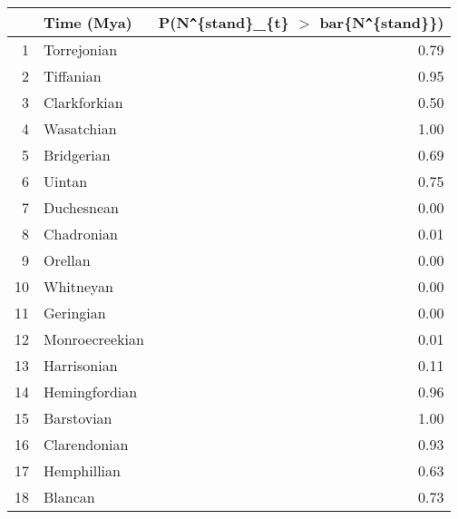 \begin{table}[ht]
\centering
\begin{tabular}{rlr}
  \hline
 & Time (Mya) & P(N\verb|^|\{stand\}\_\{t\} $>$ bar\{N\verb|^|\{stand\}\}) \\ 
  \hline
1 & Torrejonian & 0.79 \\ 
  2 & Tiffanian & 0.95 \\ 
  3 & Clarkforkian & 0.50 \\ 
  4 & Wasatchian & 1.00 \\ 
  5 & Bridgerian & 0.69 \\ 
  6 & Uintan & 0.75 \\ 
  7 & Duchesnean & 0.00 \\ 
  8 & Chadronian & 0.01 \\ 
  9 & Orellan & 0.00 \\ 
  10 & Whitneyan & 0.00 \\ 
  11 & Geringian & 0.00 \\ 
  12 & Monroecreekian & 0.01 \\ 
  13 & Harrisonian & 0.11 \\ 
  14 & Hemingfordian & 0.96 \\ 
  15 & Barstovian & 1.00 \\ 
  16 & Clarendonian & 0.93 \\ 
  17 & Hemphillian & 0.63 \\ 
  18 & Blancan & 0.73 \\ 
   \hline
\end{tabular}
\label{tab:div_peak}
\end{table}
